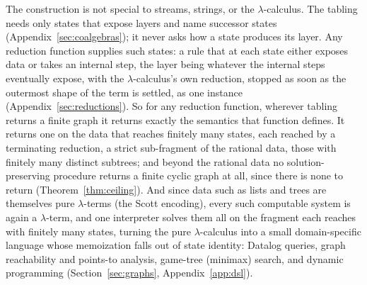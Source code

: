The construction is not special to streams, strings, or the $\lambda$-calculus. The tabling needs only states that expose layers and name successor states (Appendix~\ref{sec:coalgebras}); it never asks how a state produces its layer. Any reduction function supplies such states: a rule that at each state either exposes data or takes an internal step, the layer being whatever the internal steps eventually expose, with the $\lambda$-calculus's own reduction, stopped as soon as the outermost shape of the term is settled, as one instance (Appendix~\ref{sec:reductions}). So for any reduction function, wherever tabling returns a finite graph it returns exactly the semantics that function defines. It returns one on the data that reaches finitely many states, each reached by a terminating reduction, a strict sub-fragment of the rational data, those with finitely many distinct subtrees; and beyond the rational data no solution-preserving procedure returns a finite cyclic graph at all, since there is none to return (Theorem~\ref{thm:ceiling}). And since data such as lists and trees are themselves pure $\lambda$-terms (the Scott encoding), every such computable system is again a $\lambda$-term, and one interpreter solves them all on the fragment each reaches with finitely many states, turning the pure $\lambda$-calculus into a small domain-specific language whose memoization falls out of state identity: Datalog queries, graph reachability and points-to analysis, game-tree (minimax) search, and dynamic programming (Section~\ref{sec:graphs}, Appendix~\ref{app:dsl}).

